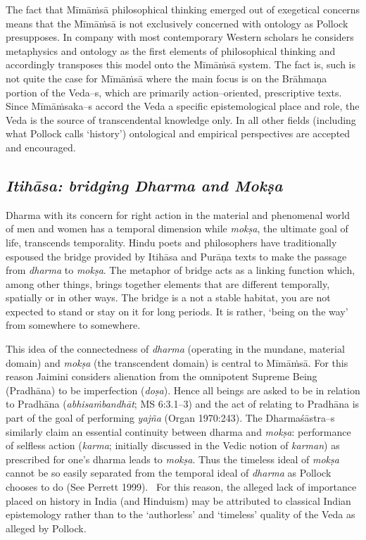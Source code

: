 The fact that Mīmāṁsā philosophical thinking emerged out of exegetical concerns means that the Mīmāṁsā is not exclusively concerned with ontology as Pollock presupposes. In company with most contemporary Western scholars he considers metaphysics and ontology as the first elements of philosophical thinking and accordingly transposes this model onto the Mīmāṁsā system. The fact is, such is not quite the case for Mīmāṁsā where the main focus is on the Brāhmaṇa portion of the Veda–s, which are primarily action–oriented, prescriptive texts. Since Mīmāṁsaka–s accord the Veda a specific epistemological place and role, the Veda is the source of transcendental knowledge only. In all other fields (including what Pollock calls ‘history’) ontological and empirical perspectives are accepted and encouraged.

\subsection*{\textit{Itihāsa: bridging Dharma and Mokṣa}}

Dharma with its concern for right action in the material and phenomenal world of men and women has a temporal dimension while \textit{mokṣa}, the ultimate goal of life, transcends temporality. Hindu poets and philosophers have traditionally espoused the bridge provided by Itihāsa and Purāṇa texts to make the passage from \textit{dharma} to \textit{mokṣa}. The metaphor of bridge acts as a linking function which, among other things, brings together elements that are different temporally, spatially or in other ways. The bridge is a not a stable habitat, you are not expected to stand or stay on it for long periods. It is rather, ‘being on the way’ from somewhere to somewhere.

This idea of the connectedness of \textit{dharma} (operating in the mundane, material domain) and \textit{mokṣa} (the transcendent domain) is central to Mīmāṁsā. For this reason Jaimini considers alienation from the omnipotent Supreme Being (Pradhāna) to be imperfection (\textit{doṣa}). Hence all beings are asked to be in relation to Pradhāna (\textit{abhisaṁbandhāt}; MS 6:3.1–3) and the act of relating to Pradhāna is part of the goal of performing \textit{yajña} (Organ 1970:243). The Dharmaśāstra–s similarly claim an essential continuity between dharma and \textit{mokṣa}: performance of selfless action (\textit{karma}; initially discussed in the Vedic notion of \textit{karman}) as prescribed for one's dharma leads to \textit{mokṣa}. Thus the timeless ideal of \textit{mokṣa} cannot be so easily separated from the temporal ideal of \textit{dharma} as Pollock chooses to do (See Perrett 1999).  For this reason, the alleged lack of importance placed on history in India (and Hinduism) may be attributed to classical Indian epistemology rather than to the ‘authorless’ and ‘timeless’ quality of the Veda as alleged by Pollock.


